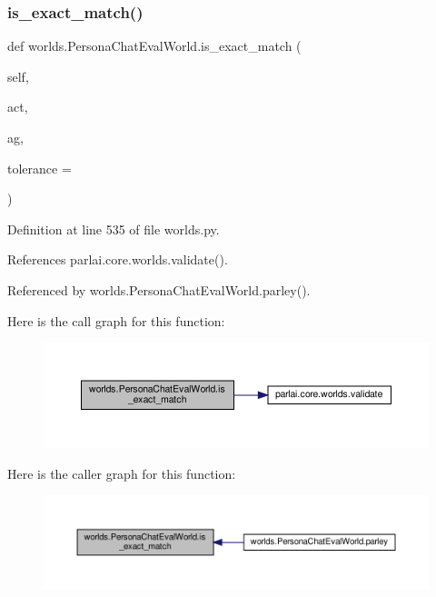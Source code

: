 \subsubsection{\texorpdfstring{is\+\_\+exact\+\_\+match()}{is\_exact\_match()}}
{\footnotesize\ttfamily def worlds.\+Persona\+Chat\+Eval\+World.\+is\+\_\+exact\+\_\+match (\begin{DoxyParamCaption}\item[{}]{self,  }\item[{}]{act,  }\item[{}]{ag,  }\item[{}]{tolerance = {} }\end{DoxyParamCaption})}



Definition at line 535 of file worlds.\+py.



References parlai.\+core.\+worlds.\+validate().



Referenced by worlds.\+Persona\+Chat\+Eval\+World.\+parley().

Here is the call graph for this function\+:
\nopagebreak
\begin{figure}[H]
\begin{center}
\leavevmode
\includegraphics[width=350pt]{classworlds_1_1PersonaChatEvalWorld_a89e55508c048d8da3aba513b94b9a684_cgraph}
\end{center}
\end{figure}
Here is the caller graph for this function\+:
\nopagebreak
\begin{figure}[H]
\begin{center}
\leavevmode
\includegraphics[width=350pt]{classworlds_1_1PersonaChatEvalWorld_a89e55508c048d8da3aba513b94b9a684_icgraph}
\end{center}
\end{figure}
\mbox{\label{classworlds_1_1PersonaChatEvalWorld_a3968b6677767a53dab21e828a8b575a6}} 
